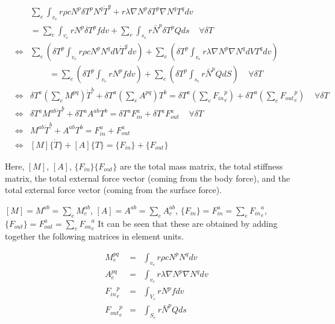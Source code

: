 \begin{eqnarray}
&&\sum_e\int_{v_e} r\rho c N^p\delta T^pN^q\dot{T}^q  + r\lambda\nabla N^p\delta T^p\nabla N^qT^qdv\\
&&= \sum_e\int_{v_e} rN^p\delta T^p f dv + \sum_e\int_{s_e}  r\bar{N}^p\delta T^p Q ds\;\;\;\;\forall\delta T\\      
&\Leftrightarrow& \sum_e\left(\delta T^p\int_{v_e} r\rho c N^pN^q dV \dot{T}^q dv\right)  + \sum_e\left(\delta T^p\int_{v_e}r\lambda\nabla N^p\nabla N^qdVT^q dv\right)\\
&&\;\;\;\;\;\;\;\;= \sum_e\left(\delta T^p\int_{v_e}r N^p f dv\right) + \sum_e\left(\delta T^p \int_{s_e}r \bar{N}^pQ dS\right)\;\;\;\;\forall\delta T\\ 
&\Leftrightarrow&\delta T^a\left(\sum_e M^{pq} \right)\dot{T}^b  + \delta T^a\left(\sum_eA^{pq}\right)T^b= \delta T^a\left(\sum_e {F_{in}}^p_e \right) + \delta T^a\left(\sum_e {F_{out}}^p_e \right)\;\;\;\;\forall\delta T\\      
&\Leftrightarrow&\delta T^a M^{ab} \dot{T}^b  + \delta T^a A^{ab}T^b= \delta T^a F_{in}^a  + \delta T^a F_{out}^a \;\;\;\;\forall\delta T\\       
&\Leftrightarrow& M^{ab} \dot{T}^b  + A^{ab}T^b= F_{in}^a  + F_{out}^a\\
&\Leftrightarrow& \left[M\right] \{\dot{T}\}  + \left[A\right]\{T\}= \{F_{in}\}  + \{F_{out}\}
\end{eqnarray}

Here, $\left[M\right]$, $\left[A\right]$, $\{F_{in}\}$$\{F_{out}\}$ are the total mass matrix, the total stiffness matrix, the total external force vector (coming from the body force), and the total external force vector (coming from the surface force).

$\left[M\right]=M^{ab}=\sum_e M^{ab}_e$, $\left[A\right]=A^{ab}=\sum_e A^{ab}_e$, $\{F_{in}\}=F_{in}^a=\sum_e {F_{in}}^a_e$, $\{F_{out}\}=F_{out}^a=\sum_e {F_{ou}}^a_e$
It can be seen that these are obtained by adding together the following matrices in element units.


\begin{tcolorbox}[title=Element mass matrix \, stiffness matrix \, external force vector]
\begin{eqnarray}
M_e^{pq}&=&\int_{v_e} r\rho c N^pN^q dv\\
A_e^{pq}&=&\int_{v_e}r\lambda\nabla N^p\nabla N^qdv\\
{F_{in}}_e^p &=& \int_{V_e} rN^p f dv\\
{F_{out}}_e^p &=&  \int_{S_e}  r\bar{N}^pQ ds
\end{eqnarray}
\end{tcolorbox}






